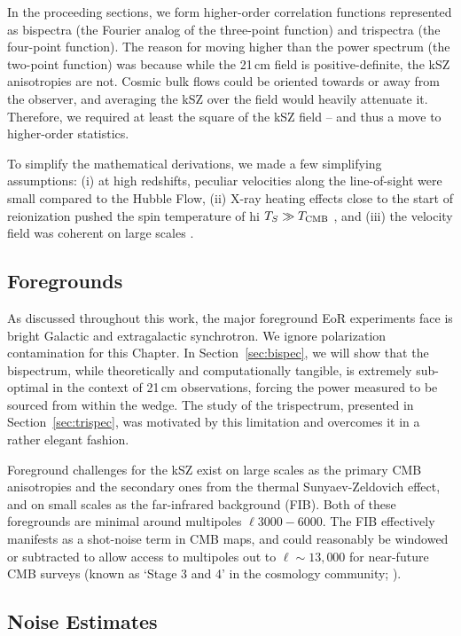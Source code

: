 In the proceeding sections, we form higher-order correlation functions represented as bispectra (the Fourier analog of the three-point function) and trispectra (the four-point function). The reason for moving higher than the power spectrum (the two-point function) was because while the 21\,cm field is positive-definite, the kSZ anisotropies are not. Cosmic bulk flows could be oriented towards or away from the observer, and averaging the kSZ over the field would heavily attenuate it. Therefore, we required at least the square of the kSZ field -- and thus a move to higher-order statistics.

To simplify the mathematical derivations, we made a few simplifying assumptions: (i) at high redshifts, peculiar velocities along the line-of-sight were small compared to the Hubble Flow, (ii) X-ray heating effects close to the start of reionization pushed the spin temperature of {\sc hi} $T_S \gg T_{\rm CMB}$ \citep[e.g.][]{Meiksin.17}, and (iii) the velocity field was coherent on large scales \citep[e.g.][]{Smith.16}.

\subsection{Foregrounds}

As discussed throughout this work, the major foreground EoR experiments face is bright Galactic and extragalactic synchrotron. We ignore polarization contamination for this Chapter. In Section~\ref{sec:bispec}, we will show that the bispectrum, while theoretically and computationally tangible, is extremely sub-optimal in the context of 21\,cm observations, forcing the power measured to be sourced from within the wedge. The study of the trispectrum, presented in Section~\ref{sec:trispec}, was motivated by this limitation and overcomes it in a rather elegant fashion.

Foreground challenges for the kSZ exist on large scales as the primary CMB anisotropies and the secondary ones from the thermal Sunyaev-Zeldovich effect, and on small scales as the far-infrared background (FIB). Both of these foregrounds are minimal around multipoles $\ell 3000 - 6000$. The FIB effectively manifests as a shot-noise term in CMB maps, and could reasonably be windowed or subtracted to allow access to multipoles out to $\ell\sim 13,000$ for near-future CMB surveys (known as `Stage 3 and 4' in the cosmology community; \citealt{cmbS4.16}).

\subsection{Noise Estimates}

